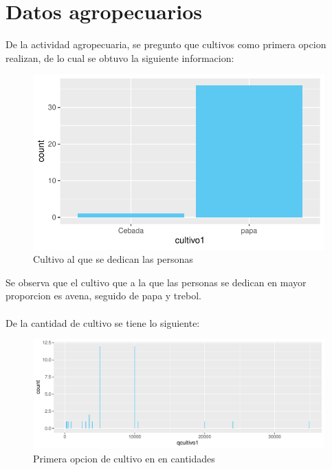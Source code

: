 \documentclass[12pt]{article}\usepackage[]{graphicx}\usepackage[]{xcolor}
\makeatletter
\def\maxwidth{ %
  \ifdim\Gin@nat@width>\linewidth
    \linewidth
  \else
    \Gin@nat@width
  \fi
}
\newenvironment{knitrout}{}{} %
\makeatother
\begin{document}
	\section{Datos agropecuarios}
	De la actividad agropecuaria, se pregunto que cultivos como primera opcion realizan, de lo cual se obtuvo la siguiente informacion:
	\begin{figure}[H]
	\centering
\begin{knitrout}
\color{fgcolor}
\includegraphics[width=\maxwidth]{figure/seven-1} 
\end{knitrout}
	\caption{Cultivo al que se dedican las personas}
	\end{figure}
	Se observa que el cultivo que a la que las personas se dedican en mayor proporcion es avena, seguido de papa y trebol.\\
	\\
	De la cantidad de cultivo se tiene lo siguiente:
	\begin{figure}[H]
	\centering
\begin{knitrout}
\color{fgcolor}
\includegraphics[width=\maxwidth]{figure/eight-1} 
\end{knitrout}
	\caption{Primera opcion de cultivo en \comunidad \- en cantidades}
	\end{figure}
	
\end{document}

